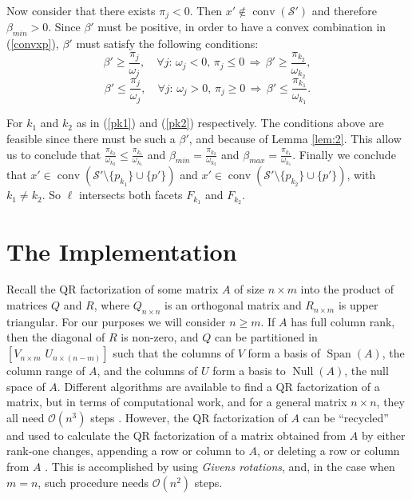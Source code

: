 {\smallskip

Now consider that there exists $\pi_j<0$. Then $x'\not\in {\operatorname{conv}}({\mathcal{S}}')$ and therefore $\beta_{min}>0$. Since $\beta'$ must be positive, in order to have a convex combination in (\ref{convxp}), $\beta'$ must satisfy the following conditions:
\begin{equation}\label{neg}
\beta'\geq\frac{\pi_j}{\omega_j},\quad\forall j: \, \omega_j<0,\, \pi_j\leq 0\,\Rightarrow\,\beta'\geq\frac{\pi_{k_2}}{\omega_{k_2}},
\end{equation}
\begin{equation}\label{pos}
\beta'\leq\frac{\pi_j}{\omega_j},\quad\forall j: \, \omega_j>0,\, \pi_j\geq 0\,\Rightarrow\,\beta'\leq\frac{\pi_{k_1}}{\omega_{k_1}}.
\end{equation}

\noindent For $k_1$ and $k_2$ as in (\ref{pk1}) and (\ref{pk2}) respectively. The conditions above are feasible since there must be such a $\beta'$, and because of Lemma \ref{lem:2}. This allow us to conclude that $\frac{\pi_{k_2}}{\omega_{k_2}}\leq\frac{\pi_{k_1}}{\omega_{k_1}}$ and $\beta_{min} = \frac{\pi_{k_2}}{\omega_{k_2}}$ and $\beta_{max} = \frac{\pi_{k_1}}{\omega_{k_1}}$. Finally we conclude that $x'\in {\operatorname{conv}}({\mathcal{S}}'\setminus\{p_{k_1}\}\cup\{p'\})$ and $x'\in {\operatorname{conv}}({\mathcal{S}}'\setminus\{p_{k_2}\}\cup\{p'\})$, with $k_1\neq k_2$. So $\ell$ intersects both facets $F_{k_1}$ and $F_{k_2}$.
}
	

\section{The Implementation}\label{sec:Implementation}

Recall the QR factorization of some matrix $A$ of size $n\times m$ into the product of matrices $Q$ and $R$, where $Q_{n\times n}$ is an orthogonal matrix and $R_{n\times m}$ is upper triangular. For our purposes we will consider $n\geq m$. If $A$ has full column rank, then the diagonal of $R$ is non-zero, and $Q$ can be partitioned in $[V_{n\times m}\, \,U_{n\times (n-m)}]$ such that the columns of $V$ form a basis of ${\operatorname{Span}}(A)$, the column range of $A$, and the columns of $U$ form a basis to ${\operatorname{Null}}(A)$, the null space of $A$. Different algorithms are available to find a QR factorization of a matrix, but in terms of computational work, and for a general matrix $n\times n$, they all need ${\mathcal{O}}(n^3)$ steps \cite[\S 5.2]{Golub96}. However, the QR factorization of $A$ can be ``recycled'' and used to calculate the QR factorization of a matrix obtained from $A$ by either rank-one changes, appending a row or column to $A$, or deleting a row or column from $A$ \cite[\S 12.5]{Golub96}. This is accomplished by using \emph{Givens rotations}, and, in the case when $m=n$, such procedure needs ${\mathcal{O}}(n^2)$ steps.

